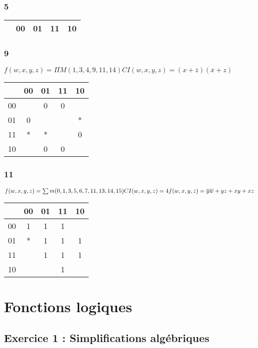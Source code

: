 \documentclass[12pt,a4paper,openany]{book}
\begin{document}
	\subsection{5}
	\begin{tabular}{c|c|c|c|c|}
		& 00&01&11&10\\
		\hline
	\end{tabular}
	\subsection{9}
	$f(w,x,y,z) = \Pi M(1,3,4,9,11,14) CI(w,x,y,z) = (x+\overline z)(\overline x + z)$\\
	\begin{tabular}{c|c|c|c|c|}
		& 00&01&11&10\\
		\hline
		00&&0&0&\\
		\hline
		01&0&&&*\\
		\hline
		11&*&*&&0\\
		\hline
		10&&0&0&\\
		\hline
	\end{tabular}
	\subsection{11}
	$f(w,x,y,z) = \sum m(0,1,3,5,6,7,11,13,14,15) CI(w,x,y,z) = 4\\
	f(w,x,y,z) = \overline y \overline w + yz + xy +xz$\\
	\begin{tabular}{c|c|c|c|c|}
		& 00&01&11&10\\
		\hline
		00&1&1&1&\\
		\hline
		01&*&1&1&1\\
		\hline
		11&&1&1&1\\
		\hline
		10&&&1&\\
		\hline
	\end{tabular}

	\chapter{Fonctions logiques}
	\section{Exercice 1 : Simplifications algébriques}
\end{document}
